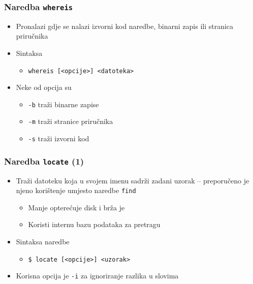 \documentclass{beamer}
\newcommand{\shell}[1]{\texttt{#1}}
\begin{document}
\begin{frame}[t]
\frametitle{Naredba \shell{whereis}}
\begin{itemize}
  \item Pronalazi gdje se nalazi izvorni kod naredbe, binarni zapis ili
        stranica priručnika
  \item Sintaksa
  \begin{itemize}
    \item \shell{whereis [<opcije>] <datoteka>}
  \end{itemize}
  \item Neke od opcija su
  \begin{itemize}
    \item[] \shell{-b} traži binarne zapise
    \item[] \shell{-m} traži stranice priručnika
    \item[] \shell{-s} traži izvorni kod
  \end{itemize}
\end{itemize}
\end{frame}

\begin{frame}[t]
\frametitle{Naredba \shell{locate} (1)}
\begin{itemize}
  \item Traži datoteku koja u svojem imenu sadrži zadani uzorak --
        preporučeno je njeno korištenje umjesto naredbe \shell{find}
  \begin{itemize}
    \item Manje opterećuje disk i brža je
    \item Koristi internu bazu podataka za pretragu
  \end{itemize}
  \item Sintaksa naredbe
  \begin{itemize}
    \item[] \shell{\$ locate [<opcije>] <uzorak>}
  \end{itemize}
  \item Korisna opcija je \shell{-i} za ignoriranje razlika u slovima
\end{itemize}
\end{frame}
\end{document}
